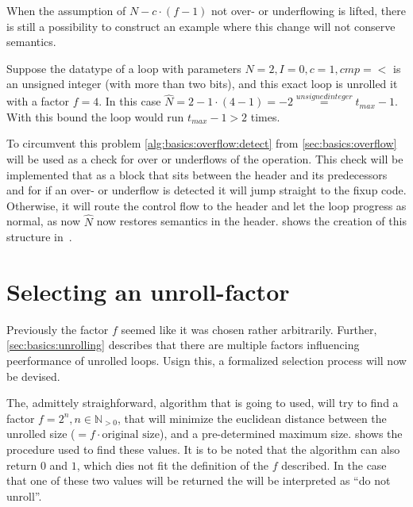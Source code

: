 

When the assumption of $N - c \cdot (f - 1)$ not over- or underflowing is lifted, there is still a possibility to construct an example where this change will not conserve semantics.

Suppose the datatype of a loop with parameters $N = 2, I = 0, c = 1, cmp = <$ is an unsigned integer (with more than two bits), and this exact loop is unrolled it with a factor $f = 4$.
In this case $\hat{N} = 2 - 1 \cdot (4 - 1) = -2 \overset{unsigned integer}{=} t_{max} - 1$.
With this bound the loop would run $t_{max} - 1 > 2$ times.

To circumvent this problem \cref{alg:basics:overflow:detect} from \cref{sec:basics:overflow} will be used as a check for over or underflows of the operation.
This check will be implemented that as a block that sits between the header and its predecessors and for if an over- or underflow is detected it will jump straight to the fixup code.
Otherwise, it will route the control flow to the header and let the loop progress as normal, as now $\hat{N}$ now restores semantics in the header.
 shows the creation of this structure in~\libFIRM.




\section{Selecting an unroll-factor}\label{sec:impl:sel-factor}

Previously the factor $f$ seemed like it was chosen rather arbitrarily.
Further, \cref{sec:basics:unrolling} describes that there are multiple factors influencing peerformance of unrolled loops.
Usign this, a formalized selection process will now be devised.

The, admittely straighforward, algorithm that is going to used, will try to find a factor $f = 2^n, n \in \mathbb{N}_{>0}$, that will minimize the euclidean distance between the unrolled size ($= f \cdot \text{original size}$), and a pre-determined maximum size.
 shows the procedure used to find these values.
It is to be noted that the algorithm can also return $0$ and $1$, which dies not fit the definition of the $f$ described.
In the case that one of these two values will be returned the will be interpreted as ``do not unroll''.

